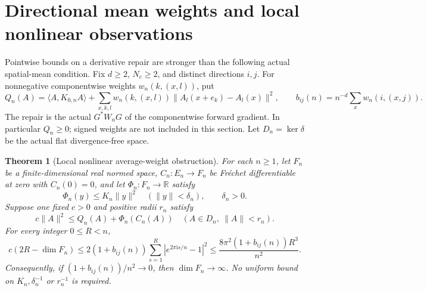 \documentclass[11pt]{article}
\newtheorem{theorem}{Theorem}[section]
\newcommand{\R}{\mathbb R}
\newcommand{\ip}[2]{\langle #1,#2\rangle}
\begin{document}
\section{Directional mean weights and local nonlinear observations}\label{sec:average}
Pointwise bounds on a derivative repair are stronger than the following
actual spatial-mean condition. Fix $d\geq2$, $N_c\geq2$, and distinct
directions $i,j$. For nonnegative componentwise weights $w_n(k,(x,l))$, put
\[
 Q_n(A)=\ip{A}{K_{0,n}A}+\sum_{x,k,l}w_n(k,(x,l))
                  \|A_l(x+e_k)-A_l(x)\|^2,
 \qquad b_{ij}(n)=n^{-d}\sum_x w_n(i,(x,j)).
\]
The repair is the actual $G^*W_nG$ of the componentwise forward gradient.
In particular $Q_n\geq0$; signed weights are not included in this section.
Let $D_n=\ker\delta$ be the actual flat divergence-free space.

\begin{theorem}[Local nonlinear average-weight obstruction]\label{thm:average}
For each $n\geq1$, let $F_n$ be a finite-dimensional real normed space,
$C_n:E_n\to F_n$ be Fr\'echet differentiable at zero with $C_n(0)=0$,
and let $\Phi_n:F_n\to\R$ satisfy
\[
 \Phi_n(y)\leq K_n\|y\|^2\quad(\|y\|<\delta_n),\qquad \delta_n>0.
\]
Suppose one fixed $c>0$ and positive radii $r_n$ satisfy
\begin{equation}\label{eq:local-average}
 c\|A\|^2\leq Q_n(A)+\Phi_n(C_n(A))
       \quad(A\in D_n,\ \|A\|<r_n).
\end{equation}
For every integer $0\leq R<n$,
\begin{equation}\label{eq:mean-finite}
 c(2R-\dim F_n)\leq 2(1+b_{ij}(n))
       \sum_{s=1}^{R}|e^{2\pi\mathrm{i}s/n}-1|^2
 \leq \frac{8\pi^2(1+b_{ij}(n))R^3}{n^2}.
\end{equation}
Consequently, if $(1+b_{ij}(n))/n^2\to0$, then $\dim F_n\to\infty$.
No uniform bound on $K_n,\delta_n^{-1}$ or $r_n^{-1}$ is required.
\end{theorem}
\end{document}
